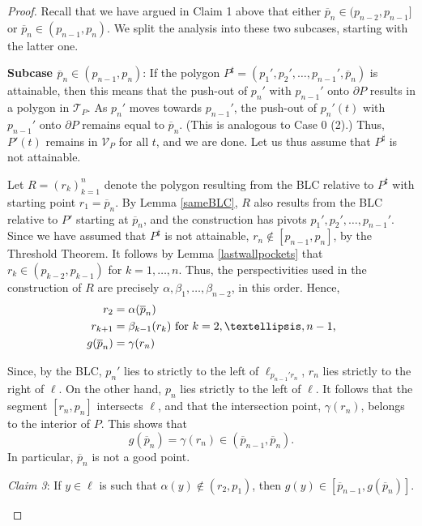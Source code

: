 \documentclass[11pt]{amsart}
\theoremstyle{remark}
\numberwithin{equation}{section}
\newcommand{\TT}{\mathcal{T}}
\newcommand{\V}{\mathcal{V}}
\begin{document}
\begin{proof}
 


Recall that we have argued in Claim 1 above that either $\overline p_n\in (p_{n-2},p_{n-1}]$ or $\overline p_n\in (p_{n-1},p_n)$. We split the analysis into these two subcases, starting with the latter one.


\textbf{Subcase $\overline p_n\in (p_{n-1},p_n)$}: If the polygon $P^{\sharp}=(p_1',p_2',\ldots,p_{n-1}',\overline p_n)$ is attainable, 
then this means that the push-out of $p_n'$ with $p_{n-1}'$ onto $\partial P$ results in a polygon in $\TT_P$. As 
$p_n'$ moves towards $p_{n-1}'$, the push-out of $p_n'(t)$ with $p_{n-1}'$ onto $\partial P$ remains equal to 
$\overline p_n$. (This is analogous to Case 0 (2).) Thus, $P'(t)$ remains in $\V_P$ for all $t$, and we are done. Let us thus assume that $P^\sharp$ is not attainable. 


Let $R=(r_k)_{k=1}^n$ denote the polygon resulting from the BLC relative to $P^\sharp$ with starting point $r_1=\overline p_n$. By Lemma \ref{sameBLC}, $R$ also results from the BLC relative to $P'$ starting at $\overline p_n$,  and the construction has pivots $p_1',p_2',\ldots,p_{n-1}'$. Since we have assumed that $P^\sharp$ is not attainable, $r_n\notin [p_{n-1},p_n]$, by the Threshold Theorem. It follows by Lemma \ref{lastwallpockets} that 
$r_k\in (p_{k-2},p_{k-1})$ for $k=1,\ldots,n$. Thus, the perspectivities   used in the construction of $R$ are precisely $\alpha,\beta_1,\ldots,\beta_{n-2}$, in this order. Hence,
\begin{align*}
r_2 &=\alpha(\overline p_n)\\
r_{k+1} &=\beta_{k-1}(r_k)\hbox{ for $k=2,\ldots,n-1$,}\\
g(\overline p_n) &=\gamma(r_n)
\end{align*}  

Since, by the BLC, $p_n'$ lies to strictly to the left of $\ell_{p_{n-1}'r_n}$,   $r_n$ lies strictly to the right of $\ell$. On the other hand, $p_n$ lies strictly to the left of $\ell$.  It follows that the segment $[r_n,p_n]$ intersects $\ell$, and that the intersection point, $\gamma(r_n)$, belongs to the interior of $P$. This shows that 
\[
g(\overline p_n)=\gamma(r_n)\in (\overline p_{n-1},\overline p_n).
\]
In particular,  $\overline p_n$ is not a good point. 


\emph{Claim 3}: If $y\in \ell$ is such that $\alpha(y)\notin (r_2, p_1)$, then $g(y)\in [\overline p_{n-1},g(\overline p_n)]$.


\begin{figure}[h]
\centering


\end{figure}
\end{proof}
\end{document}

